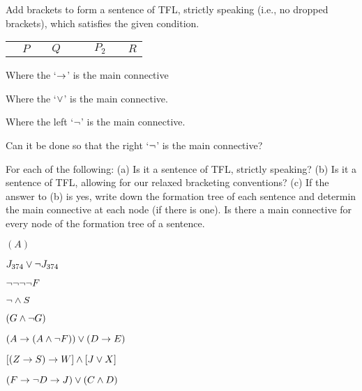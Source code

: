 \begin{practiceproblems}

\solutions

\problempart 
Add brackets to form a sentence of TFL, strictly speaking (i.e., no dropped brackets), which satisfies the given condition. 
\begin{center}
	\begin{tabular}{>{\centering}p{1em}>{\centering}p{1em}>{\centering}p{1em}>{\centering}p{1em}>{\centering}p{1em}>{\centering}p{1em}>{\centering}p{1em}>{\centering}p{1em}>{\centering}p{1em}}
		\enot &$P$&\eor &$Q$&\eif &\enot &$P_2$&\eand &$R$
	\end{tabular}
\end{center}

\begin{earg}
	\item Where the `$\rightarrow$' is the main connective
	\item Where the `$\vee$' is the main connective.
	\item Where the left `$\neg$' is the main connective. 
	\item Can it be done so that the right `$\neg$' is the main connective?
\end{earg}


\problempart
\label{pr.wiffTFL}
For each of the following: (a) Is it a sentence of TFL, strictly speaking? (b) Is it a sentence of TFL, allowing for our relaxed bracketing conventions? (c) If the answer to (b) is yes, write down the formation tree of each sentence and determin the main connective at each node (if there is one). Is there a main connective for every node of the formation tree of a sentence.
\begin{earg}
\item $(A)$\hfill {}
\item $J_{374} \vee \neg J_{374}$\hfill {}
\item $\neg \neg \neg \neg F$\hfill {}
\item $\neg \mathbin{\wedge} S$\hfill {}
\item $(G \mathbin{\wedge} \neg G)$\hfill {}
\item $(A \rightarrow (A \mathbin{\wedge} \neg F)) \vee (D \rightarrow E)$\hfill {}
\item $[(Z \rightarrow S) \rightarrow W] \mathbin{\wedge} [J \vee X]$\hfill {}
\item $(F \rightarrow \neg D \rightarrow J) \vee (C \mathbin{\wedge} D)$\hfill {}
\end{earg}



\end{practiceproblems}
